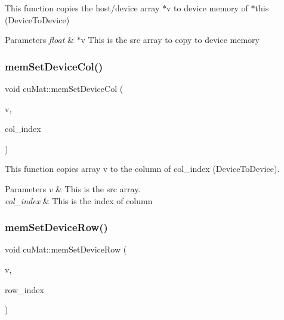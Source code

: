 This function copies the host/device array $\ast$v to device memory of $\ast$this (Device\+To\+Device) 


\begin{DoxyParams}{Parameters}
{\em float} & $\ast$v This is the src array to copy to device memory \\
\hline
\end{DoxyParams}
\mbox{\label{classcuMat_a2b11cfd9edbe5c5af48fca3361da036e}} 
\subsubsection{\texorpdfstring{mem\+Set\+Device\+Col()}{memSetDeviceCol()}}
{\footnotesize\ttfamily void cu\+Mat\+::mem\+Set\+Device\+Col (\begin{DoxyParamCaption}\item[{const float $\ast$}]{v,  }\item[{int}]{col\+\_\+index }\end{DoxyParamCaption})\hspace{0.3cm}{\ttfamily [inline]}}



This function copies array v to the column of col\+\_\+index (Device\+To\+Device). 


\begin{DoxyParams}{Parameters}
{\em v} & This is the src array. \\
\hline
{\em col\+\_\+index} & This is the index of column \\
\hline
\end{DoxyParams}
\mbox{\label{classcuMat_a7fe8fea4726b3f0a8c0112337eb5986b}} 
\subsubsection{\texorpdfstring{mem\+Set\+Device\+Row()}{memSetDeviceRow()}}
{\footnotesize\ttfamily void cu\+Mat\+::mem\+Set\+Device\+Row (\begin{DoxyParamCaption}\item[{const float $\ast$}]{v,  }\item[{int}]{row\+\_\+index }\end{DoxyParamCaption})\hspace{0.3cm}{\ttfamily [inline]}}



